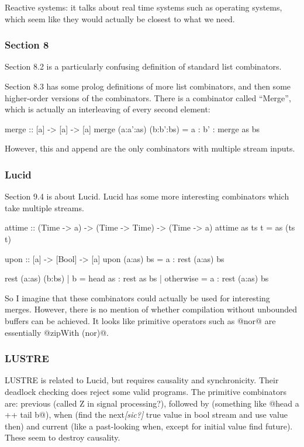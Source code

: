 Reactive systems: it talks about real time systems such as operating systems, which seem like they would actually be closest to what we need.

\subsubsection{Section 8}
Section 8.2 is a particularly confusing definition of standard list combinators.

Section 8.3 has some prolog definitions of more list combinators, and then some higher-order versions of the combinators.
There is a combinator called ``Merge'', which is actually an interleaving of every second element:

\begin{code}
merge :: [a] -> [a] -> [a]
merge (a:a':as) (b:b':bs)
 = a : b' : merge as bs
\end{code}

However, this and append are the only combinators with multiple stream inputs.

\subsubsection{Lucid}
Section 9.4 is about Lucid. Lucid has some more interesting combinators which take multiple streams.

\begin{code}
attime :: (Time -> a) -> (Time -> Time) -> (Time -> a)
attime as ts t
 = as (ts t)

upon :: [a] -> [Bool] -> [a]
upon (a:as) bs
 = a : rest (a:as) bs

rest (a:as) (b:bs)
 | b
 = head as : rest as bs
 | otherwise
 = a : rest (a:as) bs
\end{code}

So I imagine that these combinators could actually be used for interesting merges.
However, there is no mention of whether compilation without unbounded buffers can be achieved.
It looks like primitive operators such as @nor@ are essentially @zipWith (nor)@.


\subsubsection{LUSTRE}
LUSTRE is related to Lucid, but requires causality and synchronicity.
Their deadlock checking does reject some valid programs.
The primitive combinators are: previous (called Z in signal processing?), followed by (something like @head a ++ tail b@), when (find the next\emph{[sic?]} true value in bool stream and use value then) and current (like a past-looking when, except for initial value find future).
These seem to destroy causality.

